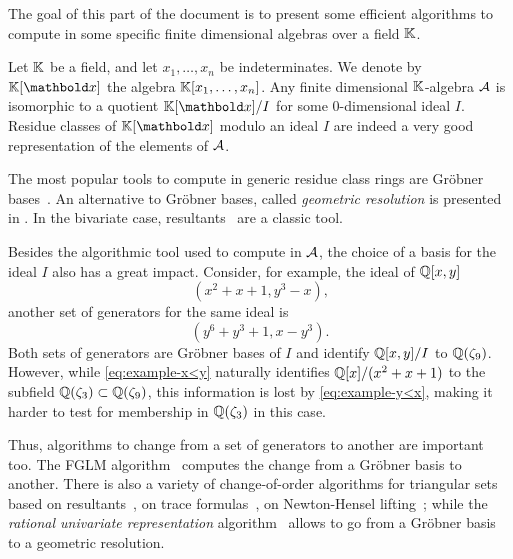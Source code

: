 The goal of this part of the document is to present some efficient
algorithms to compute in some specific finite dimensional algebras
over a field $\mathbb{K}$.

Let $\mathbb{K}$ be a field, and let $x_1,\ldots,x_n$ be indeterminates. We
denote by $\K[\lst{x}]$ the algebra $\mathbb{K}[x_1,\ldots,x_n]$. Any finite
dimensional $\mathbb{K}$-algebra $\mathcal{A}$ is isomorphic to a quotient
$\K[\lst{x}]/I$ for some $0$-dimensional ideal $I$. Residue classes of
$\K[\lst{x}]$ modulo an ideal $I$ are indeed a very good
representation of the elements of $\mathcal{A}$.

The most popular tools to compute in generic residue class rings are
Gröbner
bases~\cite{buchberger,cox+little+oshea,Cox-Little-OShea:UAG2005,faugere99,faugere02}.
An alternative to Gröbner bases, called \emph{geometric resolution} is
presented in \cite{giusti+lecerf+salvy01}. In the bivariate case,
resultants~\cite{cox+little+oshea,Cox-Little-OShea:UAG2005} are a
classic tool.

Besides the algorithmic tool used to compute in $\mathcal{A}$, the
choice of a basis for the ideal $I$ also has a great impact. Consider,
for example, the ideal of $\mathbb{Q}[x,y]$
\begin{equation}
  \label{eq:example-x<y}
  (x^2 + x + 1, y^3 - x)
  \text{,}
\end{equation}
another set of generators for the same ideal is
\begin{equation}
  \label{eq:example-y<x}
  (y^6 + y^3 + 1, x - y^3)
  \text{.}
\end{equation}
Both sets of generators are Gröbner bases of $I$ and identify
$\mathbb{Q}[x,y]/I$ to $\mathbb{Q}(\zeta_9)$. However, while \eqref{eq:example-x<y}
naturally identifies $\mathbb{Q}[x]/(x^2+x+1)$ to the subfield
$\mathbb{Q}(\zeta_3)\subset\mathbb{Q}(\zeta_9)$, this information is lost by
\eqref{eq:example-y<x}, making it harder to test for membership in
$\mathbb{Q}(\zeta_3)$ in this case.

Thus, algorithms to change from a set of generators to another are
important too. The FGLM algorithm~\cite{FGLM} computes the change from
a Gröbner basis to another. There is also a variety of change-of-order
algorithms for triangular sets based on
resultants~\cite{boulier+lemaire+moreno01}, on trace
formulas~\cite{diaz+gonzalez01,pascal+schost06}, on Newton-Hensel
lifting~\cite{dahan+jin+moreno+schost08}; while the \emph{rational
  univariate representation} algorithm~\cite{rouiller99} allows to go
from a Gröbner basis to a geometric resolution.

